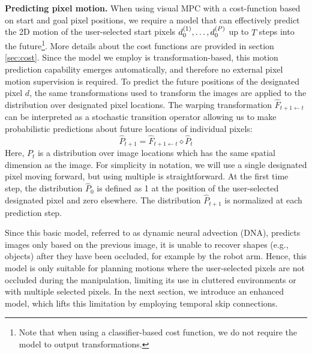 \noindent \textbf{Predicting pixel motion.} 
When using visual MPC with a cost-function based on start and goal pixel positions, we require a model that can effectively predict the 2D motion of the user-selected start pixels $d_0^{(1)}, \dots, d_0^{(P)}$ up to $T$ steps into the future\footnote{Note that when using a classifier-based cost function, we do not require the model to output transformations.}.
More details about the cost functions are provided in section \ref{sec:cost}. Since the model we employ is transformation-based, this motion prediction capability emerges automatically, and therefore no external pixel motion supervision is required. To predict the future positions of the designated pixel $d$, the same transformations used to transform the images are applied to the distribution over designated pixel locations. The warping transformation $\hat{F}_{t+1 \leftarrow t}$ can be interpreted as a stochastic transition operator allowing us to make probabilistic predictions about future locations of individual pixels:
\begin{equation}
\hat{P}_{t+1} = \hat{F}_{t+1 \leftarrow t} \diamond  \hat{P}_t
\label{eqn:prob_forward}
\end{equation}
Here, $P_t$ is a distribution over image locations which has the same spatial dimension as the image. For simplicity in notation, we will use a single designated pixel moving forward, but using multiple is straightforward. At the first time step, the distribution $\hat{P}_0$ is defined as 1 at the position of the user-selected designated pixel and zero elsewhere. The distribution $\hat{P}_{t+1}$ is normalized at each prediction step.

Since this basic model, referred to as dynamic neural advection (DNA), predicts images only based on the previous image, it is unable to recover shapes (e.g., objects) after they have been occluded, for example by the robot arm. Hence, this model is only suitable for planning motions where the user-selected pixels are not occluded during the manipulation, limiting its use in cluttered environments or with multiple selected pixels. In the next section, we introduce an enhanced model, which lifts this limitation by employing temporal skip connections. 

